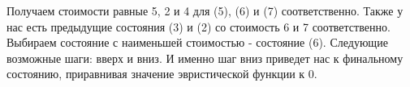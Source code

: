\begin{tcolorbox}

\end{tcolorbox}

Получаем стоимости равные 5, 2 и 4 для (5), (6) и (7) соответственно. Также у нас есть предыдущие состояния (3) и (2) со стоимость 6 и 7 соответственно. Выбираем состояние с наименьшей стоимостью - состояние (6). Следующие возможные шаги: вверх и вниз. И именно шаг вниз приведет нас к финальному состоянию, приравнивая значение эвристической функции к 0.



